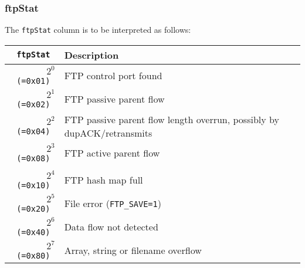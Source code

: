 \documentclass[documentation]{subfiles}
\begin{document}
\subsubsection{ftpStat}\label{ftpStat}
The {\tt ftpStat} column is to be interpreted as follows:
\begin{longtable}{>{\tt}rl}
    \toprule
    {\bf ftpStat} & {\bf Description}\\
    \midrule\endhead%
    $2^0$ (=0x01) & FTP control port found\\
    $2^1$ (=0x02) & FTP passive parent flow\\
    $2^2$ (=0x04) & FTP passive parent flow length overrun, possibly by dupACK/retransmits\\
    $2^3$ (=0x08) & FTP active parent flow\\
    \\
    $2^4$ (=0x10) & FTP hash map full \\
    $2^5$ (=0x20) & File error ({\tt FTP\_SAVE=1})\\
    $2^6$ (=0x40) & Data flow not detected\\
    $2^7$ (=0x80) & Array, string or filename overflow\\
    \bottomrule
\end{longtable}
\end{document}
